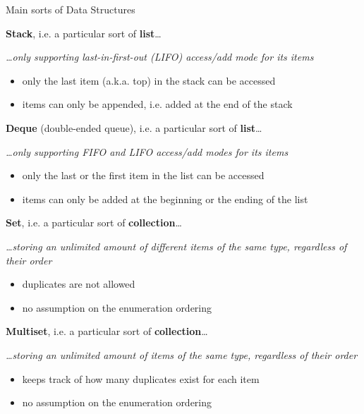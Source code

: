 \documentclass[presentation]{beamer}
\begin{document}
\begin{frame}[allowframebreaks]{Main sorts of Data Structures}
  \begin{block}{\textbf{Stack}, i.e. a particular sort of \textbf{list}\ldots}
    \begin{center}\itshape
      \ldots only supporting \alert{last-in-first-out (LIFO)} access/add mode for its items
    \end{center}
    \begin{itemize}
      \item only the \alert{last item} (a.k.a. \alert{top}) in the stack can be accessed
      \item items can only be \alert{appended}, i.e. added at the end of the stack
    \end{itemize}
  \end{block}

  \begin{block}{\textbf{Deque} (double-ended queue), i.e. a particular sort of \textbf{list}\ldots}
    \begin{center}\itshape
      \ldots only supporting \alert{FIFO and LIFO} access/add modes for its items
    \end{center}
    \begin{itemize}
      \item only the \alert{last or the first item} in the list can be accessed
      \item items can only be added at the \alert{beginning or the ending} of the list
    \end{itemize}
  \end{block}

  \begin{block}{\textbf{Set}, i.e. a particular sort of \textbf{collection}\ldots}
    \begin{center}\itshape
      \ldots storing an \alert{unlimited} amount of \alert{different} items of the \alert{same type}, \alert{regardless of their order}
    \end{center}
    \begin{itemize}
      \item duplicates are \alert{not} allowed
      \item no assumption on the enumeration ordering
    \end{itemize}
  \end{block}

  \begin{block}{\textbf{Multiset}, i.e. a particular sort of \textbf{collection}\ldots}
    \begin{center}\itshape
      \ldots storing an \alert{unlimited} amount of items of the \alert{same type}, \alert{regardless of their order}
    \end{center}
    \begin{itemize}
      \item keeps track of \alert{how many} duplicates exist for each item
      \item no assumption on the enumeration ordering
    \end{itemize}
  \end{block}


\end{frame}
\end{document}
